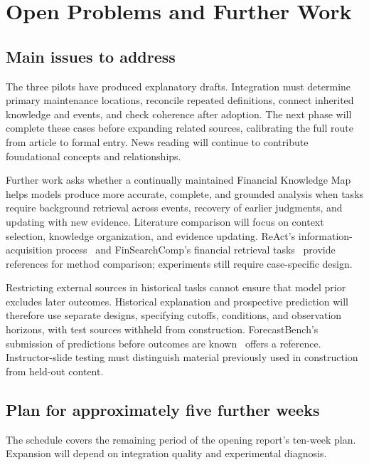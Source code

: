 \documentclass[11pt,letterpaper]{article}
\begin{document}
\newpage
\section{Open Problems and Further Work}

\subsection{Main issues to address}

The three pilots have produced explanatory drafts. Integration must determine primary maintenance locations, reconcile repeated definitions, connect inherited knowledge and events, and check coherence after adoption. The next phase will complete these cases before expanding related sources, calibrating the full route from article to formal entry. News reading will continue to contribute foundational concepts and relationships.

Further work asks whether a continually maintained Financial Knowledge Map helps models produce more accurate, complete, and grounded analysis when tasks require background retrieval across events, recovery of earlier judgments, and updating with new evidence. Literature comparison will focus on context selection, knowledge organization, and evidence updating. ReAct's information-acquisition process~\cite{react} and FinSearchComp's financial retrieval tasks~\cite{finsearch} provide references for method comparison; experiments still require case-specific design.

Restricting external sources in historical tasks cannot ensure that model prior excludes later outcomes. Historical explanation and prospective prediction will therefore use separate designs, specifying cutoffs, conditions, and observation horizons, with test sources withheld from construction. ForecastBench's submission of predictions before outcomes are known~\cite{forecastbench} offers a reference. Instructor-slide testing must distinguish material previously used in construction from held-out content.

\subsection{Plan for approximately five further weeks}

The schedule covers the remaining period of the opening report's ten-week plan. Expansion will depend on integration quality and experimental diagnosis.
\end{document}
